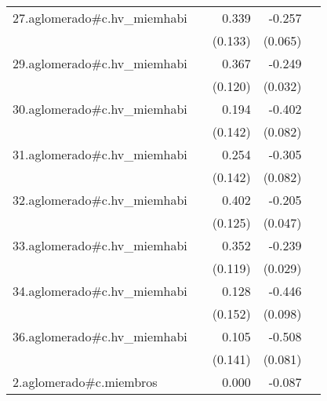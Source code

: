 {\begin{longtable}{l*{4}{D{.}{.}{-1}}}
\addlinespace
27.aglomerado#c.hv\_miemhabi&                     &       0.339\sym{*}  &      -0.257\sym{***}&                     \\
            &                     &     (0.133)         &     (0.065)         &                     \\
\addlinespace
29.aglomerado#c.hv\_miemhabi&                     &       0.367\sym{**} &      -0.249\sym{***}&                     \\
            &                     &     (0.120)         &     (0.032)         &                     \\
\addlinespace
30.aglomerado#c.hv\_miemhabi&                     &       0.194         &      -0.402\sym{***}&                     \\
            &                     &     (0.142)         &     (0.082)         &                     \\
\addlinespace
31.aglomerado#c.hv\_miemhabi&                     &       0.254         &      -0.305\sym{***}&                     \\
            &                     &     (0.142)         &     (0.082)         &                     \\
\addlinespace
32.aglomerado#c.hv\_miemhabi&                     &       0.402\sym{**} &      -0.205\sym{***}&                     \\
            &                     &     (0.125)         &     (0.047)         &                     \\
\addlinespace
33.aglomerado#c.hv\_miemhabi&                     &       0.352\sym{**} &      -0.239\sym{***}&                     \\
            &                     &     (0.119)         &     (0.029)         &                     \\
\addlinespace
34.aglomerado#c.hv\_miemhabi&                     &       0.128         &      -0.446\sym{***}&                     \\
            &                     &     (0.152)         &     (0.098)         &                     \\
\addlinespace
36.aglomerado#c.hv\_miemhabi&                     &       0.105         &      -0.508\sym{***}&                     \\
            &                     &     (0.141)         &     (0.081)         &                     \\
\addlinespace
2.aglomerado#c.miembros&                     &       0.000         &      -0.087\sym{***}&                     \\

\end{longtable}}
